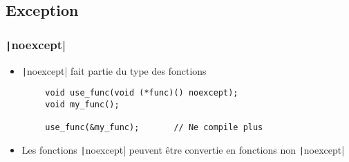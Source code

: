 \documentclass[C++.tex]{subfiles}
\begin{document}
\subsection*{Exception}
\begin{frame}[fragile]
	\frametitle{\texttt|noexcept|}
	\begin{itemize}
		\item \texttt|noexcept| fait partie du type des fonctions
	\end{itemize}

	\begin{verbatim}
		void use_func(void (*func)() noexcept);
		void my_func();

		use_func(&my_func);       // Ne compile plus
	\end{verbatim}


	\begin{itemize}
		\item Les fonctions \texttt|noexcept| peuvent être convertie en fonctions non \texttt|noexcept|
	\end{itemize}


\end{frame}
\end{document}
